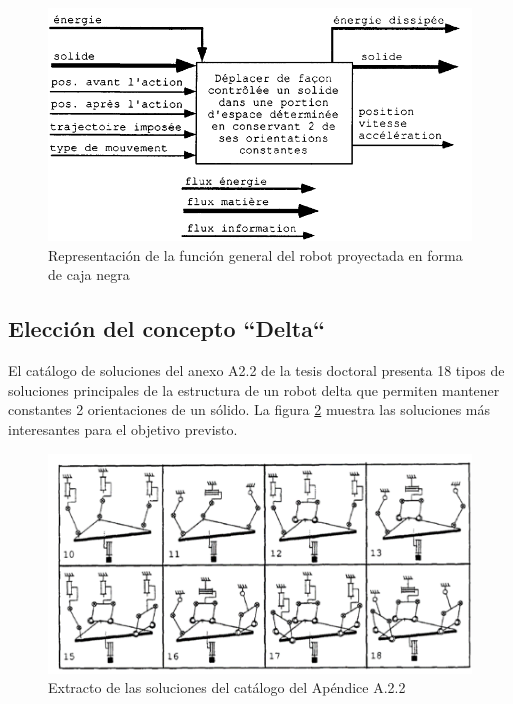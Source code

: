     \begin{figure}[htb]
        \centering
        \includegraphics[width=0.75\linewidth]{Main/Chapter3/Images3/3-3/caja-negra-reymond.png}
        \caption{Representación de la función general del robot proyectada en forma de caja negra \cite{Clavel:31403}}
        \label{f:Cap3-3_caja_negra_reymond}
    \end{figure}
    
    \newpage
    
    \subsection{Elección del concepto ``Delta``}
    El catálogo de soluciones del anexo A2.2 de la tesis doctoral \cite{Clavel:31403} presenta 18 tipos de soluciones principales de la estructura de un robot delta que permiten mantener constantes 2 orientaciones de un sólido. La figura \ref{f:Cap3-3_soluciones_interesantes_catalogo} muestra las soluciones más interesantes para el objetivo previsto. 

     \begin{figure}[htb]
        \centering
        \includegraphics[width=0.85\linewidth]{Main/Chapter3/Images3/3-3/soluciones-interesantes.png}
        \caption{Extracto de las soluciones del catálogo del Apéndice A.2.2  \cite{Clavel:31403}}
        \label{f:Cap3-3_soluciones_interesantes_catalogo}
    \end{figure}
 
